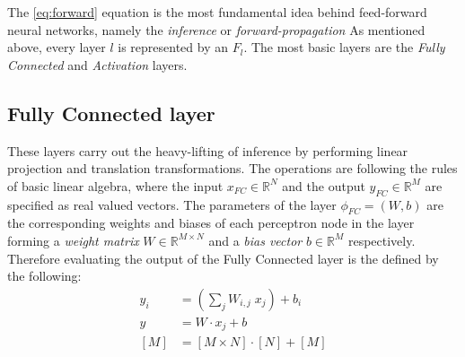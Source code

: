 The \ref{eq:forward} equation is the most fundamental idea behind feed-forward neural networks, namely the \emph{inference} or \emph{forward-propagation}
As mentioned above, every layer $l$ is represented by an $F_l$. 
The most basic layers are the \emph{Fully Connected} and \emph{Activation} layers.

\subsection{Fully Connected layer} 
These layers carry out the heavy-lifting of inference by performing linear projection and translation transformations. 
The operations are following the rules of basic linear algebra, where the input $x_{FC} \in \mathbb{R}^N$ and the output $y_{FC} \in \mathbb{R}^M$ are specified as real valued vectors.
The parameters of the layer $\phi_{FC}=(W, b)$ are the corresponding weights and biases of each perceptron node in the layer forming a \emph{weight matrix} $W \in \mathbb{R}^{M \times N}$ and a \emph{bias vector} $b \in \mathbb{R}^M$ respectively.
Therefore evaluating the output of the Fully Connected layer is the defined by the following:
\begin{equation}\label{eq:FC}
\begin{split}
    y_i &= \left(\sum_j  W_{i,j} \; x_j \right) + b_i \\
    y &= W \cdot x_j + b \\
    \left[M\right] &= \left[M \times N\right] \cdot \left[N\right] + \left[M\right]
\end{split}
\end{equation}

